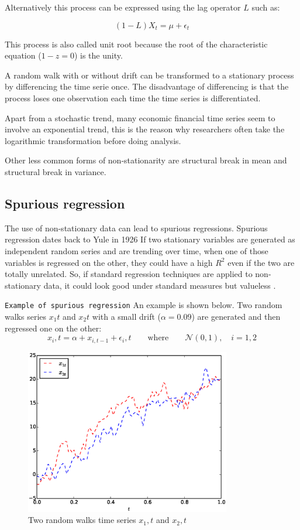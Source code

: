 Alternatively this process can be expressed using the lag operator $L$ such as:

\[
(1-L) X_t = \mu  + \epsilon_t
\]

This process is also called unit root because the root of the characteristic equation ($1-z = 0$) is the unity.  

A random walk with or without drift can be transformed to a stationary process by differencing the time serie once. The disadvantage of differencing is that the process loses one observation each time the time series is differentiated.

Apart from a stochastic trend, many economic financial time series seem to involve an exponential trend, this is the reason why researchers often take the logarithmic transformation before doing analysis.

Other less common forms of non-stationarity are structural break in mean and structural break in variance. 

\newpage
\subsection{Spurious regression}
The use
of non-stationary data can lead to spurious regressions. Spurious regression
dates back to Yule in 1926 \cite{yule1926} If two stationary
variables are generated as independent random series and are trending over time,
when one of those variables is regressed on the other, they could have a high
$R^2$ even if the two are totally unrelated. So, if standard regression
techniques are applied to non-stationary data, it could look good under standard
measures but valueless \cite{brooks2002}.

\texttt{Example of spurious regression} An example is shown below. Two random walks series $x_1t$ and $x_2t$ with a small drift ($\alpha=0.09$) are generated and
then regressed one on the other:
 \begin{equation}
 x_i,t = \alpha + x_{i,t-1} + \epsilon_i,t  \qquad \text{where} \qquad \mathcal{N}(0,1), \quad i=1,2
 \end{equation}

\begin{figure}[!h]
  \centering
  \includegraphics[width=0.8\textwidth]{img/spurious1}
  \caption{Two random walks time series $x_1,t$ and $x_2,t$}
  \label{fig:spurious1}
\end{figure}

